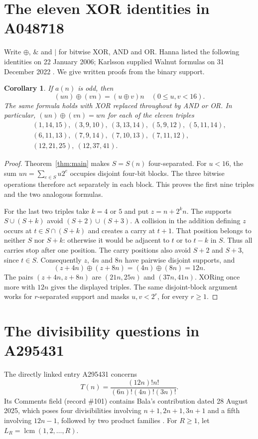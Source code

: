 \documentclass[11pt]{article}
\newtheorem{corollary}[theorem]{Corollary}
\begin{document}
\section{The eleven XOR identities in A048718}
Write $\oplus$, $\mathbin{\&}$ and $\mathbin{|}$ for bitwise XOR,
AND and OR. Hanna listed the following identities on 22 January 2006;
Karlsson supplied Walnut formulas on 31 December 2022
\cite{spaced,walnut}. We give written proofs from the binary support.

\begin{corollary}\label{cor:xor}
If $a(n)$ is odd, then
\[
 (un)\oplus(vn)=(u\oplus v)n\quad(0\leq u,v<16).
\]
The same formula holds with XOR replaced throughout by AND or OR.
In particular, $(un)\oplus(vn)=wn$ for each of the eleven triples
\[
\begin{gathered}
(1,14,15),\ (3,9,10),\ (3,13,14),\ (5,9,12),\ (5,11,14),\\
(6,11,13),\ (7,9,14),\ (7,10,13),\ (7,11,12),\\
(12,21,25),\ (12,37,41).
\end{gathered}
\]
\end{corollary}
\begin{proof}
Theorem~\ref{thm:main} makes $S=S(n)$ four-separated. For $u<16$,
the sum $un=\sum_{e\in S}u2^e$ occupies disjoint four-bit blocks.
The three bitwise operations therefore act separately in each block.
This proves the first nine triples and the two analogous formulas.

For the last two triples take $k=4$ or $5$ and put $z=n+2^kn$.
The supports $S\cup(S+k)$ avoid $(S+2)\cup(S+3)$. A collision in
the addition defining $z$ occurs at $t\in S\cap(S+k)$ and creates
a carry at $t+1$. That position belongs to neither $S$ nor $S+k$:
otherwise it would be adjacent to $t$ or to $t-k$ in $S$.
Thus all carries stop after one position. The carry positions also
avoid $S+2$ and $S+3$, since $t\in S$. Consequently $z$, $4n$ and
$8n$ have pairwise disjoint supports, and
\[
 (z+4n)\oplus(z+8n)=(4n)\oplus(8n)=12n.
\]
The pairs $(z+4n,z+8n)$ are $(21n,25n)$ and $(37n,41n)$.
XORing once more with $12n$ gives the displayed triples.
The same disjoint-block argument works for $r$-separated support and
masks $u,v<2^r$, for every $r\geq1$.
\end{proof}

\section{The divisibility questions in A295431}
The directly linked entry A295431 concerns
\[
 T(n)=\frac{(12n)!n!}{(6n)!(4n)!(3n)!}.
\]
Its Comments field (record \#101) contains Bala's contribution dated
28 August 2025, which poses four
divisibilities involving $n+1,2n+1,3n+1$ and a fifth involving
$12n-1$, followed by two product families \cite{sporadic}.
For $R\geq1$, let $L_R=\operatorname{lcm}(1,2,\ldots,R)$.
\end{document}
